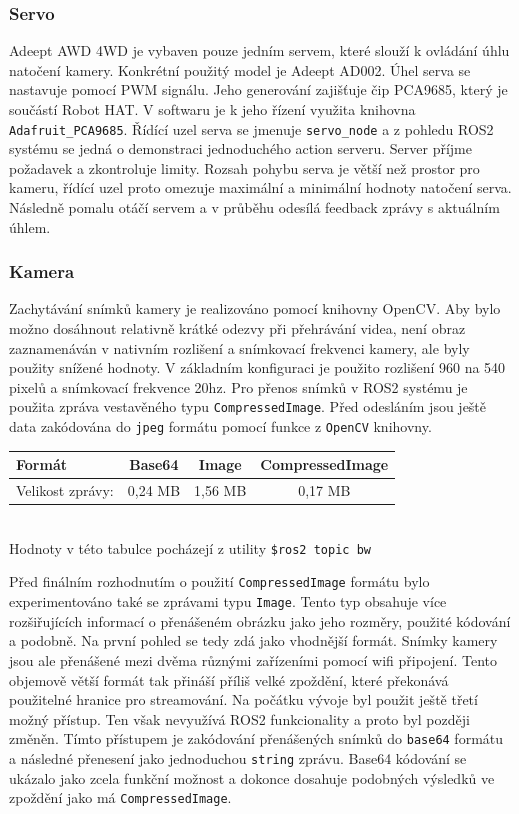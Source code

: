 \subsubsection*{Servo}
Adeept AWD 4WD je vybaven pouze jedním servem, které slouží k ovládání úhlu natočení kamery. Konkrétní použitý model je Adeept AD002. Úhel serva se nastavuje pomocí PWM signálu. Jeho generování zajišťuje čip PCA9685, který je součástí Robot HAT. V softwaru je k jeho řízení využita knihovna \verb|Adafruit_PCA9685|. Řídící uzel serva se jmenuje \verb|servo_node| a z pohledu ROS2 systému se jedná o demonstraci jednoduchého action serveru. Server příjme požadavek a zkontroluje limity. 
Rozsah pohybu serva je větší než prostor pro kameru, řídící uzel proto omezuje maximální a minimální hodnoty natočení serva. Následně pomalu otáčí servem a v průběhu odesílá feedback zprávy s aktuálním úhlem.

\subsubsection*{Kamera}
Zachytávání snímků kamery je realizováno pomocí knihovny OpenCV. Aby bylo možno dosáhnout relativně krátké odezvy při přehrávání videa, není obraz zaznamenáván v nativním rozlišení a snímkovací frekvenci kamery, ale byly použity snížené hodnoty. V základním konfiguraci je použito rozlišení 960 na 540 pixelů a snímkovací frekvence 20hz.
Pro přenos snímků v ROS2 systému je použita zpráva vestavěného typu \verb|CompressedImage|. Před odesláním jsou ještě data zakódována do \verb|jpeg| formátu pomocí funkce z \verb|OpenCV| knihovny.

\begin{center}
	\begin{tabular}{| l | c c c |}
		\hline
		Formát & Base64 & Image & CompressedImage \\ 
		\hline
		Velikost zprávy: & 0,24 MB & 1,56 MB & 0,17 MB  \\ 
		\hline 
	\end{tabular} \\ \vspace*{0.5em}
	Hodnoty v této tabulce pocházejí z utility \verb|$ros2 topic bw|
\end{center}

Před finálním rozhodnutím o použití \verb|CompressedImage| formátu bylo experimentováno také se zprávami typu \verb|Image|. Tento typ obsahuje více rozšiřujících informací o přenášeném obrázku jako jeho rozměry, použité kódování a podobně. Na první pohled se tedy zdá jako vhodnější formát. Snímky kamery jsou ale přenášené mezi dvěma různými zařízeními pomocí wifi připojení. Tento objemově větší formát tak přináší příliš velké zpoždění, které překonává použitelné hranice pro streamování. Na počátku vývoje byl použit ještě třetí možný přístup. Ten však nevyužívá ROS2 funkcionality a proto byl později změněn. Tímto přístupem je zakódování přenášených snímků do \verb|base64| formátu a následné přenesení jako jednoduchou \verb|string| zprávu. Base64 kódování se ukázalo jako zcela funkční možnost a dokonce dosahuje podobných výsledků ve zpoždění jako má \verb|CompressedImage|.
 
